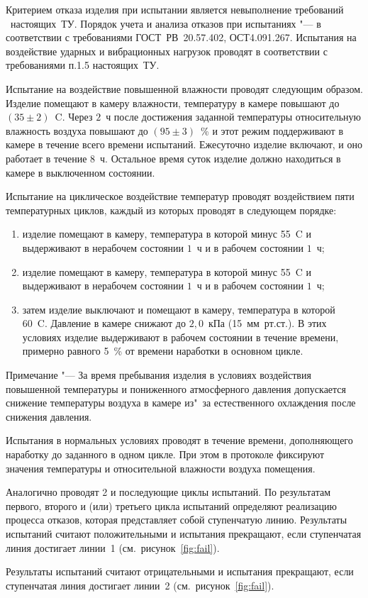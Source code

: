 Критерием отказа изделия при испытании является невыполнение требований \treb \ настоящих~ТУ. Порядок учета и анализа отказов при испытаниях "--- в соответствии с требованиями ГОСТ~РВ~20.57.402, ОСТ4.091.267.
Испытания на воздействие ударных и вибрационных нагрузок проводят в соответствии с требованиями п.1.5 настоящих~ТУ.

Испытание на воздействие повышенной влажности проводят следующим образом. Изделие помещают в камеру влажности, температуру в камере повышают до $(35 \pm 2)$~\degree C. Через $2$~ч после достижения заданной температуры относительную влажность воздуха повышают до $(95 \pm 3)$~\% и этот режим поддерживают в камере в течение всего времени испытаний. Ежесуточно изделие включают, и оно работает в течение $8$~ч. Остальное время суток изделие должно находиться в камере в выключенном состоянии.

Испытание на циклическое воздействие температур проводят воздействием пяти температурных циклов, каждый из которых проводят в следующем порядке:
\begin{enumerate}
	\item изделие помещают в камеру, температура в которой минус 55~\degree C и выдерживают в нерабочем состоянии $1$~ч и в рабочем состоянии $1$~ч;
	\item изделие помещают в камеру, температура в которой минус 55~\degree C и выдерживают в нерабочем состоянии $1$~ч и в рабочем состоянии $1$~ч;
	\item затем изделие выключают и помещают в камеру, температура в которой 60~\degree C. Давление в камере снижают до $2,0$~кПа (15~мм~рт.ст.). В этих условиях изделие выдерживают в рабочем состоянии в течение времени, примерно равного 5~\% от времени наработки в основном цикле.
\end{enumerate}

Примечание "--- За время пребывания изделия в условиях воздействия повышенной температуры и пониженного атмосферного давления допускается снижение температуры воздуха в камере из"~за естественного охлаждения после снижения давления.

Испытания в нормальных условиях проводят в течение времени, дополняющего наработку до заданного в одном цикле. При этом в протоколе фиксируют значения температуры и относительной влажности воздуха помещения.

Аналогично проводят 2 и последующие циклы испытаний. По результатам первого, второго и (или) третьего цикла испытаний определяют реализацию процесса отказов, которая представляет собой ступенчатую линию.
Результаты испытаний считают положительными и испытания прекращают, если ступенчатая линия достигает линии~1 (см.~рисунок~\ref{fig:fail}).

Результаты испытаний считают отрицательными и испытания прекращают, если ступенчатая линия достигает линии~2 (см.~рисунок~\ref{fig:fail}).